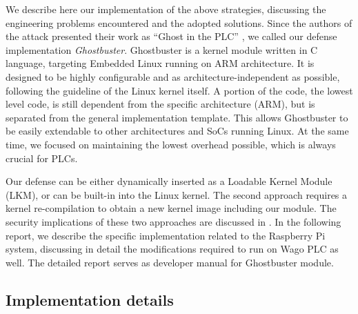 We describe here our implementation of the above strategies, discussing the engineering problems encountered and the adopted solutions.
Since the authors of the attack presented their work as ``Ghost in the PLC'' \cite{ghostplc}, we called our defense implementation \emph{Ghostbuster}.
Ghostbuster is a kernel module written in C language, targeting Embedded Linux running on ARM architecture.
It is designed to be highly configurable and as architecture-independent as possible, following the guideline of the Linux kernel itself.
A portion of the code, \ie the lowest level code, is still dependent from the specific architecture (\eg ARM), but is separated from the general implementation template.
This allows Ghostbuster to be easily extendable to other architectures and SoCs running Linux. At the same time, we focused on maintaining the lowest overhead possible,
which is always crucial for PLCs.

Our defense can be either dynamically inserted as a Loadable Kernel Module (LKM), or can be built-in into the Linux kernel.
The second approach requires a kernel re-compilation to obtain a new kernel image including our module.
The security implications of these two approaches are discussed in .
In the following report, we describe the specific implementation related to the Raspberry Pi system,
discussing in detail the modifications required to run on Wago PLC as well. The detailed report serves as developer manual for Ghostbuster module.


\subsection{Implementation details}

